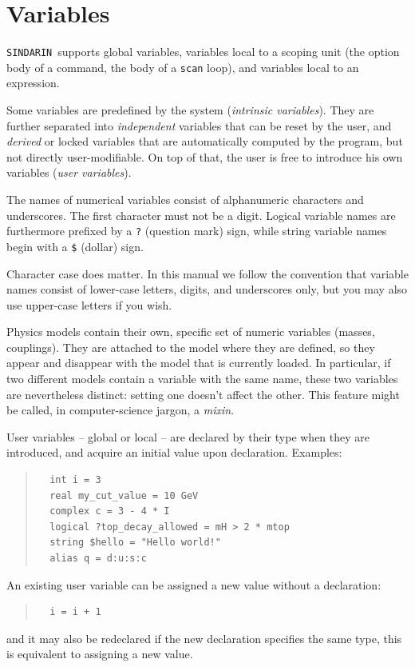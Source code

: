\documentclass[12pt]{book}
\newcommand{\ttt}[1]{\texttt{#1}}
\newcommand{\sindarin}{\ttt{SINDARIN}}
\begin{document}
\section{Variables}
\label{sec:variables}

\sindarin\ supports global variables, variables local to a scoping unit (the
option body of a command, the body of a \ttt{scan} loop), and variables local
to an expression.

Some variables are predefined by the system (\emph{intrinsic
  variables}).  They are further separated into \emph{independent}
variables that can be reset by the user, and \emph{derived} or locked
variables that are automatically computed by the program, but not
directly user-modifiable.  On top of that, the user is free to
introduce his own variables (\emph{user variables}).

The names of numerical variables consist of alphanumeric characters and
underscores.  The first character must not be a digit.  Logical
variable names are furthermore prefixed by a
\ttt{?} (question mark) sign, while string variable names begin
with a \ttt{\$} (dollar) sign.

Character case does matter.  In this manual we follow the
convention that variable names consist of lower-case letters,
digits, and underscores only, but you may also use upper-case
letters if you wish.

Physics models contain their own, specific set of numeric variables
(masses, couplings).  They are attached to the model where they are
defined, so they appear and disappear with the model that is currently
loaded.  In particular, if two different models contain a variable
with the same name, these two variables are nevertheless distinct:
setting one doesn't affect the other.  This feature might be called,
in computer-science jargon, a \emph{mixin}.

User variables -- global or local -- are declared by their type when they are
introduced, and acquire an initial value upon declaration.  Examples:
\begin{quote}
\begin{footnotesize}
\begin{verbatim}
  int i = 3
  real my_cut_value = 10 GeV
  complex c = 3 - 4 * I
  logical ?top_decay_allowed = mH > 2 * mtop
  string $hello = "Hello world!"
  alias q = d:u:s:c
\end{verbatim}
\end{footnotesize}
\end{quote}
An existing user variable can be assigned a new value without a declaration:
\begin{quote}
\begin{footnotesize}
\begin{verbatim}
  i = i + 1
\end{verbatim}
\end{footnotesize}
\end{quote}
and it may also be redeclared if the new declaration specifies the same type,
this is equivalent to assigning a new value.
\end{document}

